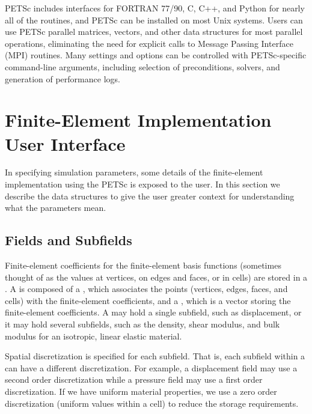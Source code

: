 PETSc includes interfaces for FORTRAN 77/90, C, C++, and Python for
nearly all of the routines, and PETSc can be installed on most Unix
systems. Users can use PETSc parallel matrices, vectors, and other
data structures for most parallel operations, eliminating the need for
explicit calls to Message Passing Interface (MPI) routines. Many
settings and options can be controlled with PETSc-specific
command-line arguments, including selection of preconditions, solvers,
and generation of performance logs.


\section{Finite-Element Implementation User Interface}

In specifying simulation parameters, some details of the
finite-element implementation using the PETSc  is
exposed to the user. In this section we describe the data structures
to give the user greater context for understanding what the parameters
mean.


\subsection{Fields and Subfields}

Finite-element coefficients for the finite-element basis functions
(sometimes thought of as the values at vertices, on edges and faces,
or in cells) are stored in a . A  is
composed of a , which associates the points (vertices,
edges, faces, and cells) with the finite-element coefficients, and a
, which is a vector storing the finite-element
coefficients. A  may hold a single subfield, such as
displacement, or it may hold several subfields, such as the density,
shear modulus, and bulk modulus for an isotropic, linear elastic
material.

Spatial discretization is specified for each subfield. That is, each subfield
within a  can have a different discretization. For
example, a displacement field may use a second order discretization
while a pressure field may use a first order discretization. If we
have uniform material properties, we use a zero order discretization
(uniform values within a cell) to reduce the storage requirements.

